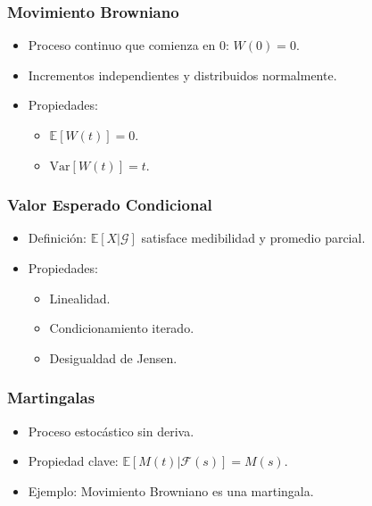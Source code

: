 \begin{frame}
    \frametitle{Movimiento Browniano}
    \begin{itemize}
        \item Proceso continuo que comienza en 0: \(W(0) = 0\).
        \item Incrementos independientes y distribuidos normalmente.
        \item Propiedades:
        \begin{itemize}
            \item \(\mathbb{E}[W(t)] = 0\).
            \item \(\text{Var}[W(t)] = t\).
        \end{itemize}
    \end{itemize}
\end{frame}


\begin{frame}
    \frametitle{Valor Esperado Condicional}
    \begin{itemize}
        \item Definición: \(\mathbb{E}[X|\mathcal{G}]\) satisface medibilidad y promedio parcial.
        \item Propiedades:
        \begin{itemize}
            \item Linealidad.
            \item Condicionamiento iterado.
            \item Desigualdad de Jensen.
        \end{itemize}
    \end{itemize}
\end{frame}


\begin{frame}
    \frametitle{Martingalas}
    \begin{itemize}
        \item Proceso estocástico sin deriva.
        \item Propiedad clave: \(\mathbb{E}[M(t)|\mathcal{F}(s)] = M(s)\).
        \item Ejemplo: Movimiento Browniano es una martingala.
    \end{itemize}
\end{frame}

